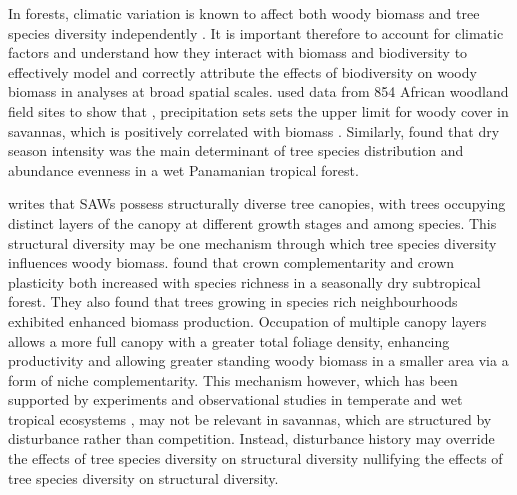 \documentclass[11pt,a4paper]{article}
\newcommand{\textapprox}{\raisebox{0.5ex}{\texttildelow}}  %
\begin{document}



In forests, climatic variation is known to affect both woody biomass \citep{Michaletz2014, Michaletz2018} and tree species diversity independently \citep{Spasojevic2014}. It is important therefore to account for climatic factors and understand how they interact with biomass and biodiversity to effectively model and correctly attribute the effects of biodiversity on woody biomass in analyses at broad spatial scales. \citet{Sankaran2005} used data from 854 African woodland field sites to show that \rnew{below a threshold of \textapprox{}650 mm MAP}, precipitation sets sets the upper limit for woody cover in savannas, which is positively correlated with biomass \citep{Chisholm2013, Prado-Junior2016}. Similarly, \citet{Condit2013} found that dry season intensity was the main determinant of tree species distribution and abundance evenness in a wet Panamanian tropical forest.

\citet{Solbrig1996} writes that SAWs possess structurally diverse tree canopies, with trees occupying distinct layers of the canopy at different growth stages and among species. This structural diversity may be one mechanism through which tree species diversity influences woody biomass. \citet{Kunz2019} found that crown complementarity and crown plasticity both increased with species richness in a seasonally dry subtropical forest. They also found that trees growing in species rich neighbourhoods exhibited enhanced biomass production. Occupation of multiple canopy layers allows a more full canopy with a greater total foliage density, enhancing productivity and allowing greater standing woody biomass in a smaller area via a form of niche complementarity. This mechanism however, which has been supported by experiments and observational studies in temperate and wet tropical ecosystems \citep{Hardiman2011, Stark2012}, may not be relevant in savannas, which are structured by disturbance rather than competition. Instead, disturbance history may override the effects of tree species diversity on structural diversity nullifying the effects of tree species diversity on structural diversity. 
\end{document}
